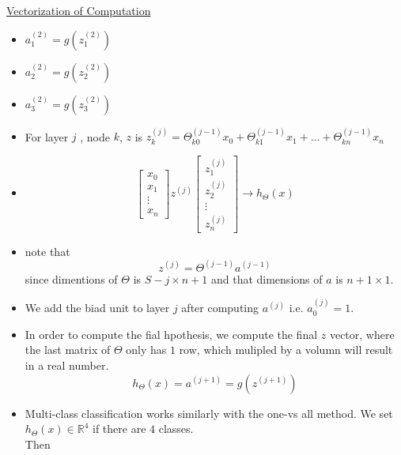 \documentclass[12pt]{article}
\begin{document}
\underline{Vectorization of Computation}

\begin{itemize}
	\item $a_1^{(2)} = g(z_1^{(2)})$
	\item $a_2^{(2)} = g(z_2^{(2)})$
	\item $a_3^{(2)} = g(z_3^{(2)})$
	\item For layer $j$ , node $k$, $z$ is $z_k^{(j)} = \Theta_{k0}^{(j-1)}x_0 + \Theta_{k1}^{(j-1)}x_1+\ldots + \Theta_{kn}^{(j-1)}x_n$
	\item 
	$$  \begin{bmatrix}
	x_0 \\
	x_1 \\
	\vdots\\
	x_n \end{bmatrix}
	z^{(j)}
	\left[
	\begin{array}{ccc} 
	z_1^{(j)}\\
	z_2^{(j)} \\
	\vdots\\
	z_n^{(j)} 
	\end{array}
	\right]
	\to h_\Theta(x)
	$$
	\item note that \[z^{(j)} = \Theta^{(j-1)}a^{(j-1)}\] since dimentions of $\Theta$ is $S-j\times n+1$ and that dimensions of $a$ is $n+1\times 1$.
	\item We add the biad unit to layer $j$ after computing $a^{(j)}$ i.e. $a_0^{(j)} = 1$.
	\item In order to compute the fial hpothesis, we compute the final $z$ vector, where the last matrix of $\Theta$ only has $1$ row, which mulipled by a volumn will result in a real number. \[h_\Theta(x) = a^{(j+1)}=g(z^{(j+1)})\]
	\item Multi-class classification works similarly with the one-vs all method. We set $h_\Theta(x)\in\mathbb{R}^4$ if there are $4$ classes. \\
	Then 
\end{itemize}
\end{document}
